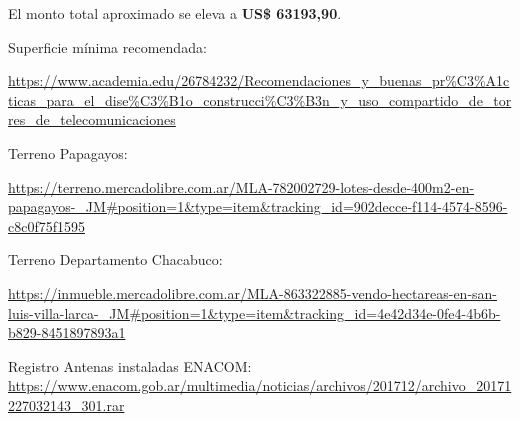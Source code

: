 El monto total aproximado se eleva a \textbf{US\$ 63193,90}.






\newpage


\begin{thebibliography}{99}
Superficie mínima recomendada: \begin{tiny}
\url{https://www.academia.edu/26784232/Recomendaciones_y_buenas_pr\%C3\%A1cticas_para_el_dise\%C3\%B1o_construcci\%C3\%B3n_y_uso_compartido_de_torres_de_telecomunicaciones}
\end{tiny}

Terreno Papagayos: \begin{tiny}
\url{https://terreno.mercadolibre.com.ar/MLA-782002729-lotes-desde-400m2-en-papagayos-_JM#position=1&type=item&tracking_id=902decce-f114-4574-8596-c8c0f75f1595}
\end{tiny}



Terreno Departamento Chacabuco:  \begin{tiny}
\url{https://inmueble.mercadolibre.com.ar/MLA-863322885-vendo-hectareas-en-san-luis-villa-larca-_JM#position=1&type=item&tracking_id=4e42d34e-0fe4-4b6b-b829-8451897893a1}
\end{tiny}


 Registro Antenas instaladas ENACOM: \url{https://www.enacom.gob.ar/multimedia/noticias/archivos/201712/archivo_20171227032143_301.rar}


\end{thebibliography}
